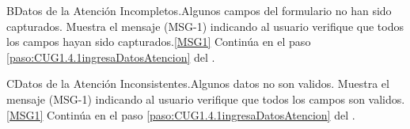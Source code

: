 	\begin{UCtrayectoriaA}{B}{Datos de la Atención Incompletos.}{Algunos campos del formulario no han sido capturados.}
			\UCpaso Muestra el mensaje (MSG-1) indicando al usuario verifique que todos los campos hayan sido capturados.\ref{MSG1}
			\UCpaso Continúa en el paso \ref{paso:CUG1.4.1ingresaDatosAtencion} del .
	\end{UCtrayectoriaA}

	\begin{UCtrayectoriaA}{C}{Datos de la Atención Inconsistentes.}{Algunos datos no son validos.}
			\UCpaso Muestra el mensaje (MSG-1) indicando al usuario verifique que todos los campos son validos.\ref{MSG1}
			\UCpaso Continúa en el paso \ref{paso:CUG1.4.1ingresaDatosAtencion} del .
	\end{UCtrayectoriaA}